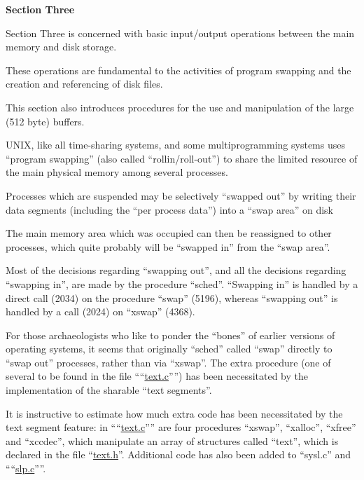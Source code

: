 %
%
{\noindent \Large \bf Section Three}

{\noindent \sf Section Three
is concerned with basic
input/output operations between the
main memory and disk storage.

These operations are fundamental to the
activities of program swapping and the
creation and referencing of disk files.

This section also introduces procedures
for the use and manipulation of the
large (512 byte) buffers.
}


UNIX, like all time-sharing systems,
and some multiprogramming systems uses
``program swapping'' (also called ``rollin/roll-out'')
 to share the limited
resource of the main physical memory
among several processes.

Processes which are suspended may be
selectively ``swapped out'' by writing
their data segments (including the ``per
process data'') into a ``swap area'' on
disk

The main memory area which was occupied
can then be reassigned to other
processes, which quite probably will be
``swapped in'' from the ``swap area''.

Most of the decisions regarding ``swapping out'', and all the decisions
regarding ``swapping in'', are made by
the procedure ``sched''. ``Swapping in'' is
handled by a direct call (2034) on the
procedure ``swap'' (5196), whereas ``swapping out'' is handled by a call (2024)
on ``xswap'' (4368).

For those archaeologists who like to
ponder the ``bones'' of earlier versions
of operating systems, it seems that
originally ``sched'' called ``swap''
directly to ``swap out'' processes,
rather than via ``xswap''. The extra procedure (one of several to be found in
the file ````\href{./v6/ken/text.c}{text.c}'''') has been necessitated by the implementation of the
sharable ``text segments''.

It is instructive to estimate how much
extra code has been necessitated by the
text segment feature: in ````\href{./v6/ken/text.c}{text.c}'''' are
four procedures ``xswap'', ``xalloc'',
``xfree'' and ``xccdec'', which manipulate
an array of structures called ``text'',
which is declared in the file ``\href{./v6/text.h}{text.h}''.
Additional code has also been added to
``sysl.c'' and ````\href{./v6/ken/slp.c}{slp.c}''''.



